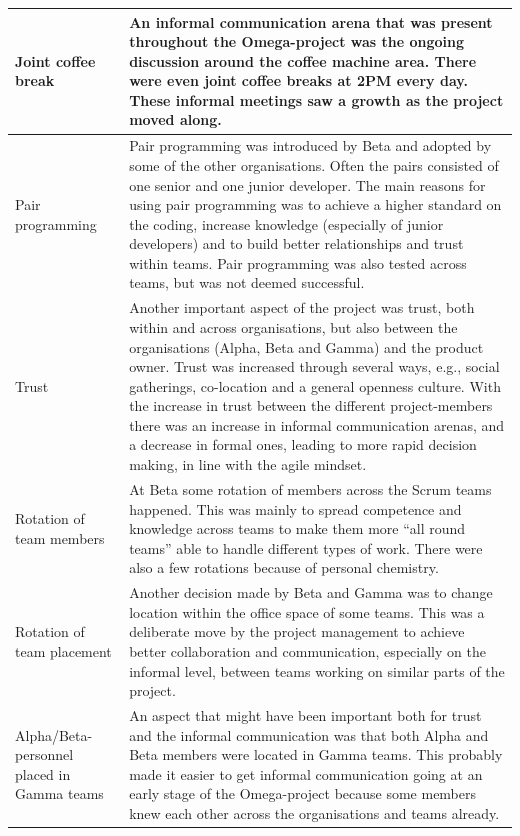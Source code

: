 \begin{center}
\begin{longtable}{| p{6cm} | p{9cm} |}
    Joint coffee break & An informal communication arena that was present throughout the Omega-project was the ongoing discussion around the coffee machine area. There were even joint coffee breaks at 2PM every day. These informal meetings saw a growth as the project moved along. \\ \hline
    Pair programming & Pair programming was introduced by Beta and adopted by some of the other organisations. Often the pairs consisted of one senior and one junior developer. The main reasons for using pair programming was to achieve a higher standard on the coding, increase knowledge (especially of junior developers) and to build better relationships and trust within teams. Pair programming was also tested across teams, but was not deemed successful. \\ \hline
    Trust & Another important aspect of the project was trust, both within and across organisations, but also between the organisations (Alpha, Beta and Gamma) and the product owner. Trust was increased through several ways, e.g., social gatherings, co-location and a general openness culture. With the increase in trust between the different project-members there was an increase in informal communication arenas, and a decrease in formal ones, leading to more rapid decision making, in line with the agile mindset. \\ \hline
    Rotation of team members & At Beta some rotation of members across the Scrum teams happened. This was mainly to spread competence and knowledge across teams to make them more ``all round teams'' able to handle different types of work. There were also a few rotations because of personal chemistry. \\ \hline
    Rotation of team placement & Another decision made by Beta and Gamma was to change location within the office space of some teams. This was a deliberate move by the project management to achieve better collaboration and communication, especially on the informal level, between teams working on similar parts of the project. \\ \hline
    Alpha/Beta-personnel placed in Gamma teams & An aspect that might have been important both for trust and the informal communication was that both Alpha and Beta members were located in Gamma teams. This probably made it easier to get informal communication going at an early stage of the Omega-project because some members knew each other across the organisations and teams already. \\ \hline

\end{longtable}
\end{center}
